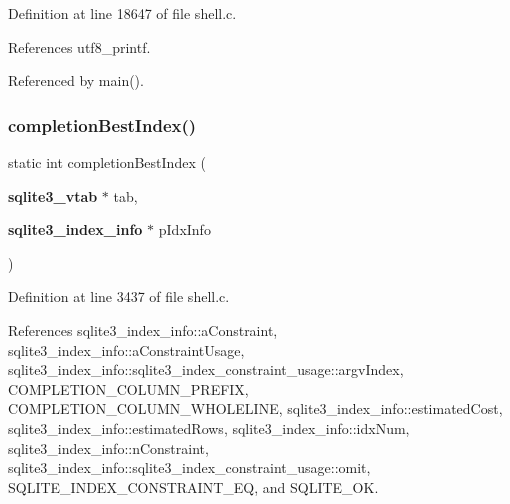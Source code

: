 Definition at line 18647 of file shell.\+c.



References utf8\+\_\+printf.



Referenced by main().


\mbox{\label{shell_8c_ad5165ab4e9fa033fb29687bcef5711ad}} 
\subsubsection{completion\+Best\+Index()}
{\footnotesize\ttfamily static int completion\+Best\+Index (\begin{DoxyParamCaption}\item[{\textbf{ sqlite3\+\_\+vtab} $\ast$}]{tab,  }\item[{\textbf{ sqlite3\+\_\+index\+\_\+info} $\ast$}]{p\+Idx\+Info }\end{DoxyParamCaption})\hspace{0.3cm}{\ttfamily [static]}}



Definition at line 3437 of file shell.\+c.



References sqlite3\+\_\+index\+\_\+info\+::a\+Constraint, sqlite3\+\_\+index\+\_\+info\+::a\+Constraint\+Usage, sqlite3\+\_\+index\+\_\+info\+::sqlite3\+\_\+index\+\_\+constraint\+\_\+usage\+::argv\+Index, C\+O\+M\+P\+L\+E\+T\+I\+O\+N\+\_\+\+C\+O\+L\+U\+M\+N\+\_\+\+P\+R\+E\+F\+IX, C\+O\+M\+P\+L\+E\+T\+I\+O\+N\+\_\+\+C\+O\+L\+U\+M\+N\+\_\+\+W\+H\+O\+L\+E\+L\+I\+NE, sqlite3\+\_\+index\+\_\+info\+::estimated\+Cost, sqlite3\+\_\+index\+\_\+info\+::estimated\+Rows, sqlite3\+\_\+index\+\_\+info\+::idx\+Num, sqlite3\+\_\+index\+\_\+info\+::n\+Constraint, sqlite3\+\_\+index\+\_\+info\+::sqlite3\+\_\+index\+\_\+constraint\+\_\+usage\+::omit, S\+Q\+L\+I\+T\+E\+\_\+\+I\+N\+D\+E\+X\+\_\+\+C\+O\+N\+S\+T\+R\+A\+I\+N\+T\+\_\+\+EQ, and S\+Q\+L\+I\+T\+E\+\_\+\+OK.



